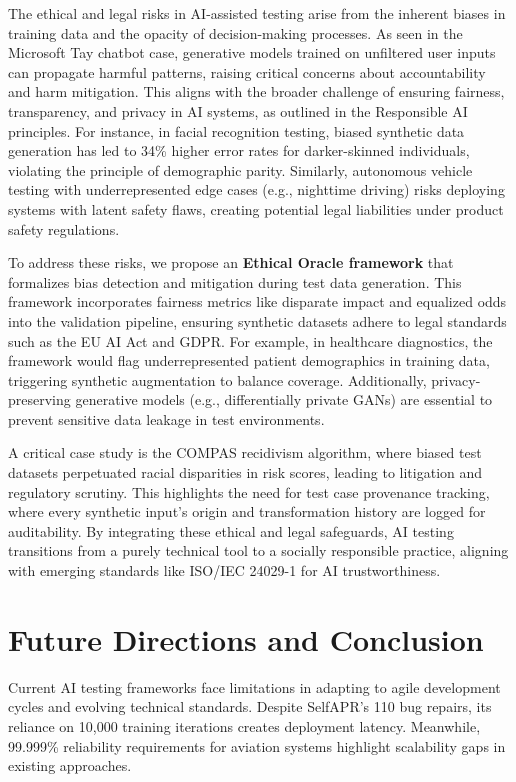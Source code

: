 \documentclass[manuscript,screen,review]{acmart}
\begin{document}
The ethical and legal risks in AI-assisted testing arise from the inherent biases in training data and the opacity of decision-making processes. As seen in the Microsoft Tay chatbot case, generative models trained on unfiltered user inputs can propagate harmful patterns, raising critical concerns about accountability and harm mitigation. This aligns with the broader challenge of ensuring fairness, transparency, and privacy in AI systems, as outlined in the Responsible AI principles\cite{Zhou2024}. For instance, in facial recognition testing, biased synthetic data generation has led to 34\% higher error rates for darker-skinned individuals, violating the principle of demographic parity. Similarly, autonomous vehicle testing with underrepresented edge cases (e.g., nighttime driving) risks deploying systems with latent safety flaws, creating potential legal liabilities under product safety regulations.

To address these risks, we propose an \textbf{Ethical Oracle framework} that formalizes bias detection and mitigation during test data generation. This framework incorporates fairness metrics like disparate impact and equalized odds into the validation pipeline, ensuring synthetic datasets adhere to legal standards such as the EU AI Act and GDPR. For example, in healthcare diagnostics, the framework would flag underrepresented patient demographics in training data, triggering synthetic augmentation to balance coverage. Additionally, privacy-preserving generative models (e.g., differentially private GANs) are essential to prevent sensitive data leakage in test environments.

A critical case study is the COMPAS recidivism algorithm, where biased test datasets perpetuated racial disparities in risk scores, leading to litigation and regulatory scrutiny. This highlights the need for test case provenance tracking, where every synthetic input’s origin and transformation history are logged for auditability. By integrating these ethical and legal safeguards, AI testing transitions from a purely technical tool to a socially responsible practice, aligning with emerging standards like ISO/IEC 24029-1 for AI trustworthiness.

\section{Future Directions and Conclusion}

Current AI testing frameworks face limitations in adapting to agile development cycles and evolving technical standards. Despite SelfAPR's 110 bug repairs, its reliance on 10,000 training iterations creates deployment latency. Meanwhile, 99.999\% reliability requirements for aviation systems highlight scalability gaps in existing approaches.
\end{document}
